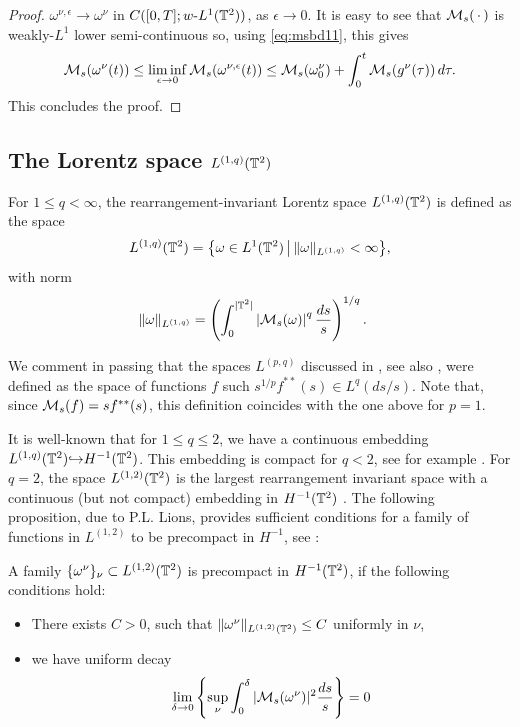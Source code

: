 \documentclass[reqno,12pt]{amsart}
\begin{document}
\begin{proof}
$\omega^{\nu,\epsilon} \to \omega^{\nu}$  in $C([0,T];w\text{-}L^1(\mathbb{T}^2))$, as $\epsilon \to 0$. It is easy to see that $\mathcal{M}_s({\,\cdot\,})$  is weakly-$L^1$ lower semi-continuous so, using \eqref{eq:msbd11}, this gives
\[
\mathcal{M}_s(\omega^{\nu}(t))
\le
\liminf_{\epsilon \to 0}
\mathcal{M}_s(\omega^{\nu,\epsilon}(t))
\le
\mathcal{M}_s(\omega^{\nu}_0)
+
\int_0^t \mathcal{M}_s(g^{\nu}(\tau)) \, d\tau.
\]
This concludes the proof.
\end{proof}

\subsection{The Lorentz space $L^{(1,q)}(\mathbb{T}^2)$}
\label{sec:Lorentz}

For $1 \le q <\infty$, the rearrangement-invariant Lorentz space $L^{(1,q)}(\mathbb{T}^2)$ is defined as the space
\[
L^{(1,q)}(\mathbb{T}^2)
=
{\left\{ \omega \in L^1(\mathbb{T}^2) \,\middle|\, \Vert \omega \Vert_{L^{(1,q)}} < \infty \right\}},
\]
with norm
\begin{align*}
\Vert \omega \Vert_{L^{(1,q)}}
&=
\left(
\int_0^{|\mathbb{T}^2|} \left|\mathcal{M}_s(\omega)\right|^q \frac{ds}{s}
\right)^{1/q}.
\end{align*}

\begin{remark} \label{l1qfstarstar}
We comment in passing that the spaces $L^{(p,q)}$ discussed in \cite[Section 2.3]{LNT}, see also \cite[(4.39)]{Lions}, were defined as the space of functions $f$ such $s^{1/p}f^{\ast\ast}(s) \in L^q(ds/s)$. Note that, since $\mathcal{M}_s(f)=sf^{\ast\ast}(s)$, this definition coincides with the one above for $p=1$.
\end{remark}

It is well-known that for $1\le q \le 2$, we have a continuous embedding $L^{(1,q)}(\mathbb{T}^2) {\hookrightarrow} H^{-1}(\mathbb{T}^2)$. This embedding is compact for $q < 2$, see for example \cite[Theorem 2.3]{LNT}. For $q=2$, the space $L^{(1,2)}(\mathbb{T}^2)$ is the largest rearrangement invariant space with a continuous (but not compact) embedding in $H^{-1}(\mathbb{T}^2)$ \cite{Lions}. The following proposition, due to P.L. Lions, provides sufficient conditions for a family of functions in $L^{(1,2)}$ to be precompact in $H^{-1}$, see \cite[Lemma 4.1]{Lions}:
\begin{proposition}[P.L. Lions]
\label{prop:lions}
  A family $\{ \omega^\nu \}_{\nu} \subset L^{(1,2)}(\mathbb{T}^2)$ is precompact in $H^{-1}(\mathbb{T}^2)$, if the following conditions hold:
  \begin{itemize}
  \item[(i)] There exists $C>0$, such that $\Vert \omega^\nu \Vert_{L^{(1,2)}(\mathbb{T}^2)} \le C$ uniformly in $\nu$,
  \item[(ii)] we have uniform decay
    \[
    \lim_{\delta \to 0} \left\{ \sup_{\nu} \int_0^\delta | \mathcal{M}_s(\omega^\nu) |^2 \frac{ds}{s} \right\} = 0
    \]
  \end{itemize}
\end{proposition}
\end{document}
